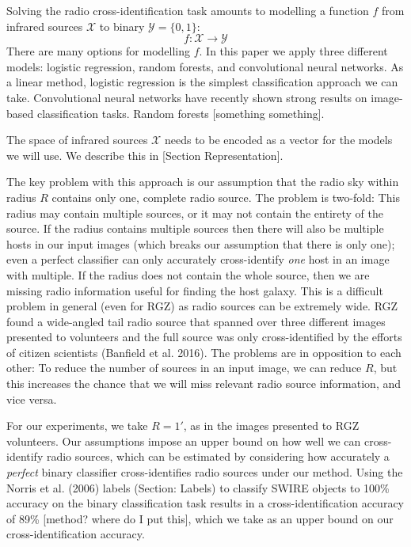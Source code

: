 \documentclass[fleqn,usenatbib,usedcolumn]{mnras}
\begin{document}
    Solving the radio cross-identification task amounts to modelling a
    function \(f\) from infrared sources \(\mathcal{X}\) to binary
    \(\mathcal{Y} = \{0, 1\}\): \[
        f : \mathcal{X} \to \mathcal{Y}
    \] There are many options for modelling \(f\). In this paper we apply
    three different models: logistic regression, random forests, and
    convolutional neural networks. As a linear method, logistic regression
    is the simplest classification approach we can take. Convolutional
    neural networks have recently shown strong results on image-based
    classification tasks. Random forests {[}something something{]}.

    The space of infrared sources \(\mathcal{X}\) needs to be encoded as a
    vector for the models we will use. We describe this in {[}Section
    Representation{]}.

    The key problem with this approach is our assumption that the radio sky
    within radius \(R\) contains only one, complete radio source. The
    problem is two-fold: This radius may contain multiple sources, or it may
    not contain the entirety of the source. If the radius contains multiple
    sources then there will also be multiple hosts in our input images
    (which breaks our assumption that there is only one); even a perfect
    classifier can only accurately cross-identify \emph{one} host in an
    image with multiple. If the radius does not contain the whole source,
    then we are missing radio information useful for finding the host
    galaxy. This is a difficult problem in general (even for RGZ) as radio
    sources can be extremely wide. RGZ found a wide-angled tail radio source
    that spanned over three different images presented to volunteers and the
    full source was only cross-identified by the efforts of citizen
    scientists (Banfield et al. 2016). The problems are in opposition to
    each other: To reduce the number of sources in an input image, we can
    reduce \(R\), but this increases the chance that we will miss relevant
    radio source information, and vice versa.

    For our experiments, we take \(R = 1'\), as in the images presented to
    RGZ volunteers. Our assumptions impose an upper bound on how well we can
    cross-identify radio sources, which can be estimated by considering how
    accurately a \emph{perfect} binary classifier cross-identifies radio
    sources under our method. Using the Norris et al. (2006) labels
    (Section: Labels) to classify SWIRE objects to 100\% accuracy on the
    binary classification task results in a cross-identification accuracy of
    89\% {[}method? where do I put this{]}, which we take as an upper bound
    on our cross-identification accuracy.
\end{document}
